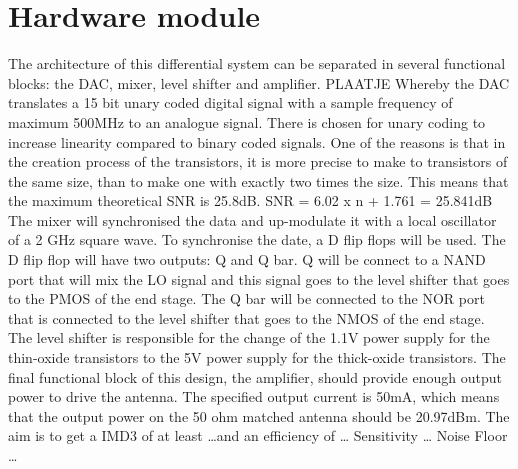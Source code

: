 \section{Hardware module}\label{sec:overview}
The architecture of this differential system can be separated in several functional blocks: the DAC, mixer, level shifter and amplifier.
PLAATJE
Whereby the DAC translates a 15 bit unary coded digital signal with a sample frequency of maximum 500MHz to an analogue signal. There is chosen for unary coding to increase linearity compared to binary coded signals. One of the reasons is that in the creation process of the transistors, it is more precise to make to transistors of the same size, than to make one with exactly two times the size. This means that the maximum theoretical SNR is 25.8dB.
SNR = 6.02 x n + 1.761 = 25.841dB 
The mixer will synchronised the data and up-modulate it with a local oscillator of a 2 GHz square wave. To synchronise the date, a D flip flops will be used. The D flip flop will have two outputs: Q and Q bar. Q will be connect to a NAND port that will mix the LO signal and this signal goes to the level shifter that goes to the PMOS of the end stage.  The Q bar will be connected to the NOR port that is connected to the level shifter that goes to the NMOS of the end stage.
The level shifter is responsible for the change of the 1.1V power supply for the thin-oxide transistors to the 5V power supply for the thick-oxide transistors.
The final functional block of this design, the amplifier, should provide enough output power to drive the antenna. The specified output current is 50mA, which means that the output power on the 50 ohm matched antenna should be 20.97dBm.
The aim is to get a IMD3 of at least \ldots and an efficiency of \ldots 
Sensitivity \ldots
Noise Floor \ldots
